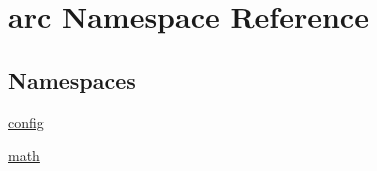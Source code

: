 \hypertarget{namespacearc}{}\section{arc Namespace Reference}
\label{namespacearc}
\subsection*{Namespaces}
\begin{DoxyCompactItemize}
\item 
 \mbox{\hyperlink{namespacearc_1_1config}{config}}
\item 
 \mbox{\hyperlink{namespacearc_1_1math}{math}}
\end{DoxyCompactItemize}

